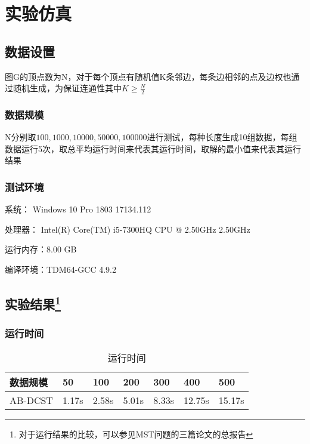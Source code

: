 \chapter{实验仿真}
\section{数据设置}
图G的顶点数为N，对于每个顶点有随机值K条邻边，每条边相邻的点及边权也通过随机生成，为保证连通性其中$K \geq \frac{N}{2}$

\subsection{数据规模}
N分别取$100,1000,10000,50000,100000$进行测试，每种长度生成10组数据，每组数据运行5次，取总平均运行时间来代表其运行时间，取解的最小值来代表其运行结果
\subsection{测试环境}
系统：    Windows 10 Pro 1803 17134.112 \par
处理器：  Intel(R) Core(TM) i5-7300HQ CPU @ 2.50GHz 2.50GHz \par
运行内存：8.00 GB \par
编译环境：TDM64-GCC 4.9.2
\section{实验结果\protect\footnote[1]{对于运行结果的比较，可以参见MST问题的三篇论文的总报告}}
\subsection{运行时间}

\begin{table}[H]
  \caption{运行时间}
  \centering
  \begin{tabular}{p{2.6cm}<{\centering}p{1.3cm}<{\centering}p{1.3cm}<{\centering}p{1.3cm}<{\centering}p{1.3cm}<{\centering}p{1.3cm}<{\centering}p{1.3cm}<{\centering}}
  \toprule
   数据规模  & 50 & 100 & 200 & 300 & 400 & 500\\
  \midrule
   AB-DCST & 1.17s & 2.58s & 5.01s & 8.33s & 12.75s &15.17s\\
  \bottomrule
  \end{tabular} 
    
\end{table}